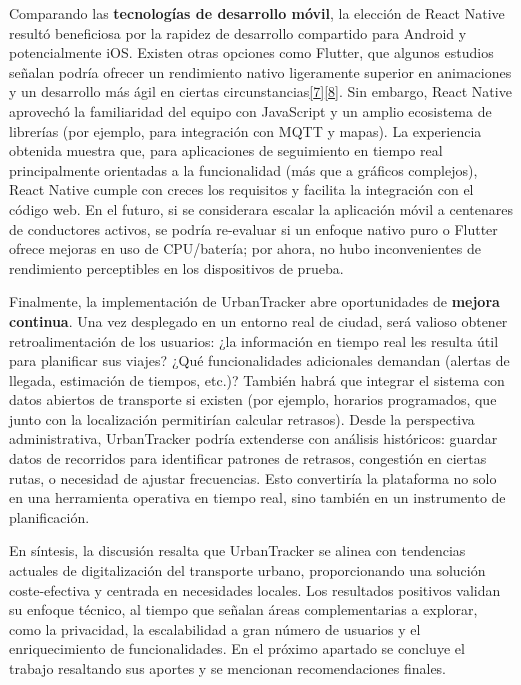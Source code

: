 Comparando las \textbf{tecnologías de desarrollo móvil}, la elección de React Native resultó beneficiosa por la rapidez de desarrollo compartido para Android y potencialmente iOS. Existen otras opciones como Flutter, que algunos estudios señalan podría ofrecer un rendimiento nativo ligeramente superior en animaciones y un desarrollo más ágil en ciertas circunstancias\href{https://fliphtml5.com/lqsof/cdpg/Art\%C3\%ADculos/\#:~:text=librer\%C3\%ADas\%20externas\%20para\%20muchos\%20componentes,tener\%20un\%20rendimiento\%20menor\%20en}{{[}7{]}}\href{https://fliphtml5.com/lqsof/cdpg/Art\%C3\%ADculos/\#:~:text=potentes\%20y\%20de\%20c\%C3\%B3digo\%20abierto\%2C,cuanto\%20al\%20tiempo\%20de\%20creaci\%C3\%B3n}{{[}8{]}}. Sin embargo, React Native aprovechó la familiaridad del equipo con JavaScript y un amplio ecosistema de librerías (por ejemplo, para integración con MQTT y mapas). La experiencia obtenida muestra que, para aplicaciones de seguimiento en tiempo real principalmente orientadas a la funcionalidad (más que a gráficos complejos), React Native cumple con creces los requisitos y facilita la integración con el código web. En el futuro, si se considerara escalar la aplicación móvil a centenares de conductores activos, se podría re-evaluar si un enfoque nativo puro o Flutter ofrece mejoras en uso de CPU/batería; por ahora, no hubo inconvenientes de rendimiento perceptibles en los dispositivos de prueba.

Finalmente, la implementación de UrbanTracker abre oportunidades de \textbf{mejora continua}. Una vez desplegado en un entorno real de ciudad, será valioso obtener retroalimentación de los usuarios: ¿la información en tiempo real les resulta útil para planificar sus viajes? ¿Qué funcionalidades adicionales demandan (alertas de llegada, estimación de tiempos, etc.)? También habrá que integrar el sistema con datos abiertos de transporte si existen (por ejemplo, horarios programados, que junto con la localización permitirían calcular retrasos). Desde la perspectiva administrativa, UrbanTracker podría extenderse con análisis históricos: guardar datos de recorridos para identificar patrones de retrasos, congestión en ciertas rutas, o necesidad de ajustar frecuencias. Esto convertiría la plataforma no solo en una herramienta operativa en tiempo real, sino también en un instrumento de planificación.

En síntesis, la discusión resalta que UrbanTracker se alinea con tendencias actuales de digitalización del transporte urbano, proporcionando una solución coste-efectiva y centrada en necesidades locales. Los resultados positivos validan su enfoque técnico, al tiempo que señalan áreas complementarias a explorar, como la privacidad, la escalabilidad a gran número de usuarios y el enriquecimiento de funcionalidades. En el próximo apartado se concluye el trabajo resaltando sus aportes y se mencionan recomendaciones finales.
